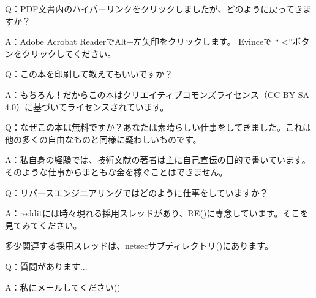 \par Q：PDF文書内のハイパーリンクをクリックしましたが、どのように戻ってきますか？
\par A：Adobe Acrobat ReaderでAlt+左矢印をクリックします。 Evinceで `` <''ボタンをクリックしてください。

\par Q：この本を印刷して教えてもいいですか？
\par A：もちろん！だからこの本はクリエイティブコモンズライセンス（CC BY-SA 4.0）に基づいてライセンスされています。

\par Q：なぜこの本は無料ですか？あなたは素晴らしい仕事をしてきました。これは他の多くの自由なものと同様に疑わしいものです。
\par A：私自身の経験では、技術文献の著者は主に自己宣伝の目的で書いています。そのような仕事からまともな金を稼ぐことはできません。

\par Q：リバースエンジニアリングではどのように仕事をしていますか？
\par A：redditには時々現れる採用スレッドがあり、RE\FNURLREDDIT{}(\RedditHiringThread{})に専念しています。そこを見てみてください。

多少関連する採用スレッドは、netsecサブディレクトリ(\NetsecHiringThread{})にあります。

\par Q：質問があります...
\par A：私にメールしてください(\EMAIL)
